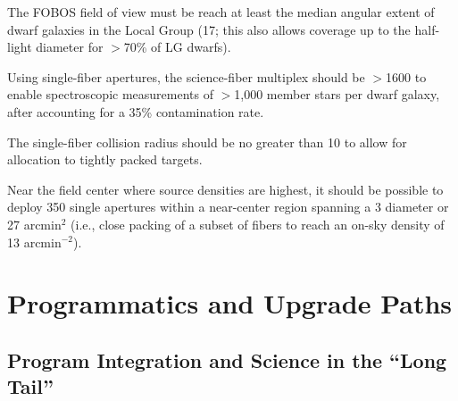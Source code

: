 \documentclass[11pt,a4paper,twoside,onecolumn,openany,final,oldfontcommands]{memoir}
\begin{document}
\medskip
\begin{sciencerequirement}

\reqitem The FOBOS field of view must be reach at least the median angular extent of dwarf galaxies in the Local Group (17\arcmin; this also allows coverage up to the half-light diameter for $>$70\% of LG dwarfs).

\reqitem Using single-fiber apertures, the science-fiber multiplex should be $>$1600 to enable spectroscopic measurements of $>$1,000 member stars per dwarf galaxy, after accounting for a 35\% contamination rate.

\reqitem The single-fiber collision radius should be no greater than 10\arcsec{} to allow for allocation to tightly packed targets.

\reqitem Near the field center where source densities are highest, it should be possible to deploy 350 single apertures within a near-center region spanning a 3\arcmin{} diameter or 27 arcmin$^{2}$ (i.e., close packing of a subset of fibers to reach an on-sky density of 13 arcmin$^{-2}$).

\end{sciencerequirement}

\chapter{Programmatics and Upgrade Paths}

\section{Program Integration and Science in the ``Long Tail''}
\label{sec:synergy}

\end{document}
